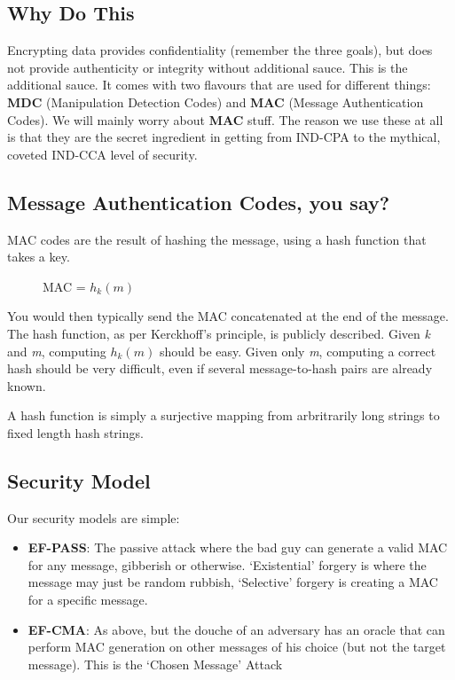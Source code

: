     \subsection{Why Do This}
        Encrypting data provides confidentiality (remember the three goals), but does not provide authenticity or integrity without additional sauce. This is the additional sauce.
        It comes with two flavours that are used for different things: \textbf{MDC} (Manipulation Detection Codes) and \textbf{MAC} (Message Authentication Codes). We will mainly worry about \textbf{MAC} stuff.
        The reason we use these at all is that they are the secret ingredient in getting from IND-CPA to the mythical, coveted IND-CCA level of security.


    \subsection{\textbf{M}essage \textbf{A}uthentication \textbf{C}odes, you say?}
    MAC codes are the result of hashing the message, using a hash function that takes a key.
    \begin{figure}[htp!]
        \centering
        MAC = $h_{k}(m)$
    \end{figure}

    You would then typically send the MAC concatenated at the end of the message. The hash function, as per Kerckhoff's principle, is publicly described. Given \emph{k} and \emph{m}, computing $h_{k}(m)$ should be easy.
    Given only \emph{m}, computing a correct hash should be very difficult, even if several message-to-hash pairs are already known.

    A hash function is simply a surjective mapping from arbritrarily long strings to fixed length hash strings. 

    \subsection{Security Model}
    Our security models are simple:
    \begin{itemize}
        \item \textbf{EF-PASS}: The passive attack where the bad guy can generate a valid MAC for any message, gibberish or otherwise. 
        `Existential' forgery is where the message may just be random rubbish, `Selective' forgery is creating a MAC for a specific message.

        \item \textbf{EF-CMA}: As above, but the douche of an adversary has an oracle that can perform MAC generation on other messages of his choice (but not the target message). This is the `Chosen Message' Attack
    \end{itemize}

